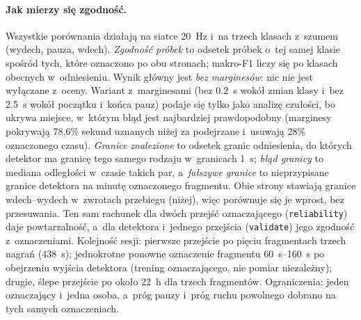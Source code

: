\documentclass[12pt,a4paper,oneside]{report}
\begin{document}
\paragraph{Jak mierzy się zgodność.} Wszystkie porównania działają na siatce \SI{20}{Hz}
i~na trzech klasach z~szumem (wydech, pauza, wdech). \emph{Zgodność próbek} to odsetek próbek
o~tej samej klasie spośród tych, które oznaczono po obu stronach; makro-F1 liczy się po klasach
obecnych w~odniesieniu. Wynik główny jest \emph{bez marginesów}: nic nie jest wyłączane
z~oceny. Wariant z~marginesami (bez \SI{0.2}{s} wokół zmian klasy i~bez \SI{2.5}{s} wokół
początku i~końca pauz) podaje się tylko jako analizę czułości, bo ukrywa miejsce, w~którym błąd jest
najbardziej prawdopodobny (marginesy pokrywają 78,6\% sekund uznanych niżej za podejrzane i~usuwają
28\% oznaczonego czasu). \emph{Granice znalezione} to odsetek granic odniesienia, do których detektor
ma granicę tego samego rodzaju w~granicach \SI{1}{s}; \emph{błąd granicy} to mediana odległości w~czasie
takich par, a~\emph{fałszywe granice} to nieprzypisane granice detektora na minutę oznaczonego
fragmentu. Obie strony stawiają granice wdech--wydech w~zwrotach przebiegu (niżej), więc porównuje
się je wprost, bez przesuwania. Ten sam rachunek dla dwóch
przejść oznaczającego (\texttt{reliability}) daje powtarzalność, a~dla detektora i~jednego
przejścia (\texttt{validate}) jego zgodność z~oznaczeniami. Kolejność sesji: pierwsze przejście po
pięciu fragmentach trzech nagrań (\SI{438}{s}); jednokrotne ponowne oznaczenie fragmentu
\SIrange{60}{160}{s} po obejrzeniu wyjścia detektora (trening oznaczającego, nie pomiar
niezależny); drugie, ślepe przejście po około \SI{22}{h} dla trzech fragmentów. Ograniczenia:
jeden oznaczający i~jedna osoba, a~próg pauzy i~próg ruchu powolnego dobrano na tych samych
oznaczeniach.
\end{document}
